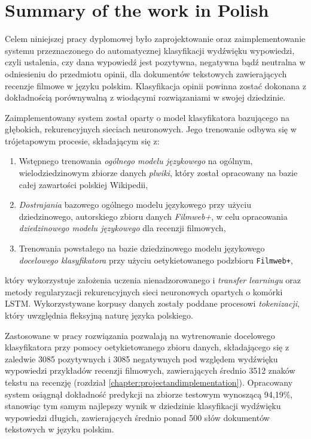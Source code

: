 \chapter{Summary of the work in Polish}

Celem niniejszej pracy dyplomowej było zaprojektowanie oraz zaimplementowanie systemu przeznaczonego do automatycznej klasyfikacji wydźwięku wypowiedzi, czyli ustalenia, czy dana wypowiedź jest pozytywna, negatywna bądź neutralna w odniesieniu do przedmiotu opinii, dla dokumentów tekstowych zawierających recenzje filmowe w języku polskim. Klasyfikacja opinii powinna zostać dokonana z dokładnością porównywalną z wiodącymi rozwiązaniami w swojej dziedzinie.

Zaimplementowany system został oparty o model klasyfikatora bazującego na głębokich, rekurencyjnych sieciach neuronowych. Jego trenowanie odbywa się w trójetapowym procesie, składającym się z:

\begin{enumerate}
    \item Wstępnego trenowania \emph{ogólnego modelu językowego} na ogólnym, wielodziedzinowym zbiorze danych \emph{plwiki}, który został opracowany na bazie całej zawartości polskiej Wikipedii,
    \item \emph{Dostrajania} bazowego ogólnego modelu językowego przy użyciu dziedzinowego, autorskiego zbioru danych \emph{Filmweb+}, w celu opracowania \emph{dziedzinowego modelu językowego} dla recenzji filmowych,
    \item Trenowania powstałego na bazie dziedzinowego modelu językowego \emph{docelowego klasyfikatora} przy użyciu oetykietowanego podzbioru \lstinline{Filmweb+},
\end{enumerate}

który wykorzystuje założenia uczenia nienadzorowanego i \emph{transfer learningu} oraz metody regularyzacji rekurencyjnych sieci neuronowych opartych o komórki LSTM. Wykorzystywane korpusy danych zostały poddane procesowi \emph{tokenizacji}, który uwzględnia fleksyjną naturę języka polskiego.

Zastosowane w pracy rozwiązania pozwalają na wytrenowanie docelowego klasyfikatora przy pomocy oetykietowanego zbioru danych, składającego się z zaledwie 3085 pozytywnych i 3085 negatywnych pod względem wydźwięku wypowiedzi przykładów recenzji filmowych, zawierających średnio 3512 znaków tekstu na recenzję (rozdział \ref{chapter:projectandimplementation}). Opracowany system osiągnął dokładność predykcji na zbiorze testowym wynoszącą 94,19\%, stanowiąc tym samym najlepszy wynik w dziedzinie klasyfikacji wydźwięku wypowiedzi długich, zawierających średnio ponad 500 słów dokumentów tekstowych w języku polskim.

